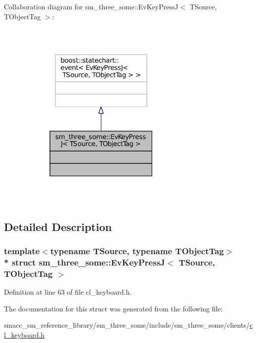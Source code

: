Collaboration diagram for sm\+\_\+three\+\_\+some\+:\+:Ev\+Key\+PressJ$<$ T\+Source, T\+Object\+Tag $>$\+:
\nopagebreak
\begin{figure}[H]
\begin{center}
\leavevmode
\includegraphics[width=235pt]{structsm__three__some_1_1EvKeyPressJ__coll__graph}
\end{center}
\end{figure}


\subsection{Detailed Description}
\subsubsection*{template$<$typename T\+Source, typename T\+Object\+Tag$>$\\*
struct sm\+\_\+three\+\_\+some\+::\+Ev\+Key\+Press\+J$<$ T\+Source, T\+Object\+Tag $>$}



Definition at line 63 of file cl\+\_\+keyboard.\+h.



The documentation for this struct was generated from the following file\+:\begin{DoxyCompactItemize}
\item 
smacc\+\_\+sm\+\_\+reference\+\_\+library/sm\+\_\+three\+\_\+some/include/sm\+\_\+three\+\_\+some/clients/\hyperlink{cl__keyboard_8h}{cl\+\_\+keyboard.\+h}\end{DoxyCompactItemize}
